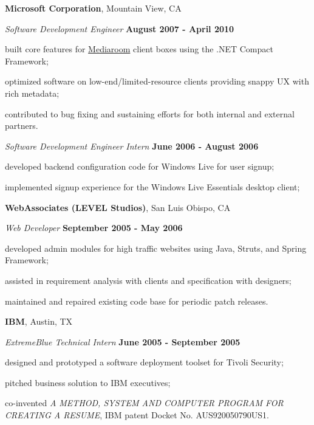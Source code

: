 \documentclass[margin,line]{res}
\newenvironment{list1}{
  \begin{list}{\ding{113}}{%
      \setlength{\itemsep}{0in}
      \setlength{\parsep}{0in} \setlength{\parskip}{0in}
      \setlength{\topsep}{0in} \setlength{\partopsep}{0in} 
      \setlength{\leftmargin}{0.17in}}}{\end{list}}
\begin{document}
\begin{resume}
{\bf Microsoft Corporation}, Mountain View, CA

\vspace{-.3cm}
{\em Software Development Engineer} \hfill {\small \bf August 2007 - April 2010}
\begin{list1}
\item[] built core features for \href{http://www.microsoftmediaroom.com/}{Mediaroom} client boxes using the .NET Compact Framework;
\item[] optimized software on low-end/limited-resource clients providing snappy UX with rich metadata;
\item[] contributed to bug fixing and sustaining efforts for both internal and external partners.
\end{list1}

\vspace{-.3cm}
{\em Software Development Engineer Intern} \hfill {\small \bf June 2006 - August 2006}
\begin{list1}
\item[] developed backend configuration code for Windows Live for user signup;
\item[] implemented signup experience for the Windows Live Essentials desktop client;
\end{list1}

{\bf WebAssociates (LEVEL Studios)}, San Luis Obispo, CA

\vspace{-.3cm}
{\em Web Developer} \hfill {\small \bf September 2005 - May 2006}
\begin{list1}
\item[] developed admin modules for high traffic websites using Java, Struts, and Spring Framework;
\item[] assisted in requirement analysis with clients and specification with designers;
\item[] maintained and repaired existing code base for periodic patch releases.
\end{list1}

{\bf IBM}, Austin, TX

\vspace{-.3cm}
{\em ExtremeBlue Technical Intern} \hfill {\small \bf June 2005 - September 2005}
\begin{list1}
\item[] designed and prototyped a software deployment toolset for Tivoli Security;
\item[] pitched business solution to IBM executives;
\item[] co-invented {\em A METHOD, SYSTEM AND COMPUTER PROGRAM FOR CREATING A RESUME}, IBM patent Docket No. AUS920050790US1.
\end{list1}	


\end{resume}
\end{document}
